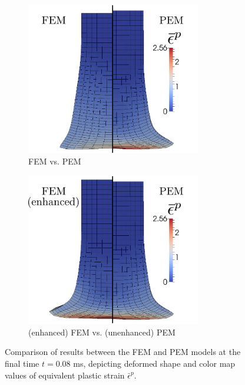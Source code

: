 \begin{figure}[!h]
    \centering
    \begin{subfigure}[b]{0.49\linewidth}
            \centering
            \includegraphics[width=3.0in]{figures/taylor_bar_unmodified_eqps.pdf}
    			\caption{FEM vs. PEM \label{fig:taylor_bar_unmodified_eqps}}
    \end{subfigure}
	\begin{subfigure}[b]{0.49\linewidth}
            \centering
            \includegraphics[width=3.0in]{figures/taylor_bar_fbar_eqps.pdf}
    			\caption{(enhanced) FEM vs. (unenhanced) PEM \label{fig:taylor_bar_fbar_eqps}}
    \end{subfigure}
    \caption{Comparison of results between the FEM and PEM models at the final time $t = 0.08$ ms, depicting deformed shape and color map values of equivalent plastic strain $\bar{\epsilon}^p$.}
    \label{fig:taylor_bar_eqps}
\end{figure}

